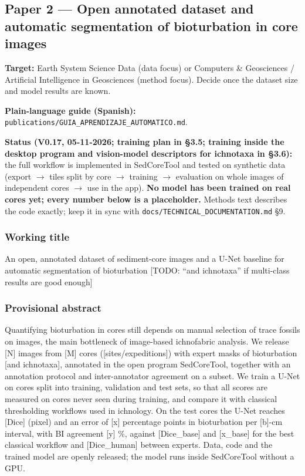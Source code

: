 \documentclass[
  10pt,
]{article}
\begin{document}
\hypertarget{paper-2-open-annotated-dataset-and-automatic-segmentation-of-bioturbation-in-core-images}{%
\subsection{Paper 2 --- Open annotated dataset and automatic
segmentation of bioturbation in core
images}\label{paper-2-open-annotated-dataset-and-automatic-segmentation-of-bioturbation-in-core-images}}

\textbf{Target:} Earth System Science Data (data focus) or Computers \&
Geosciences / Artificial Intelligence in Geosciences (method focus).
Decide once the dataset size and model results are known.

\textbf{Plain-language guide (Spanish):}
\texttt{publications/GUIA\_APRENDIZAJE\_AUTOMATICO.md}.

\textbf{Status (V0.17, 05-11-2026; training plan in §3.5; training
inside the desktop program and vision-model descriptors for ichnotaxa in
§3.6):} the full workflow is implemented in SedCoreTool and tested on
synthetic data (export $\rightarrow$ tiles split by core $\rightarrow$ training $\rightarrow$ evaluation on
whole images of independent cores $\rightarrow$ use in the app). \textbf{No model
has been trained on real cores yet; every number below is a
placeholder.} Methods text describes the code exactly; keep it in sync
with \texttt{docs/TECHNICAL\_DOCUMENTATION.md} §9.

\hypertarget{working-title}{%
\subsubsection{Working title}\label{working-title}}

An open, annotated dataset of sediment-core images and a U-Net baseline
for automatic segmentation of bioturbation {[}TODO: ``and ichnotaxa'' if
multi-class results are good enough{]}

\hypertarget{provisional-abstract}{%
\subsubsection{Provisional abstract}\label{provisional-abstract}}

Quantifying bioturbation in cores still depends on manual selection of
trace fossils on images, the main bottleneck of image-based ichnofabric
analysis. We release {[}N{]} images from {[}M{]} cores
({[}sites/expeditions{]}) with expert masks of bioturbation {[}and
ichnotaxa{]}, annotated in the open program SedCoreTool, together with
an annotation protocol and inter-annotator agreement on a subset. We
train a U-Net on cores split into training, validation and test sets, so
that all scores are measured on cores never seen during training, and
compare it with classical thresholding workflows used in ichnology. On
the test cores the U-Net reaches {[}Dice{]} (pixel) and an error of
{[}x{]} percentage points in bioturbation per {[}b{]}-cm interval, with
BI agreement {[}y{]} \%, against {[}Dice\_base{]} and {[}x\_base{]} for
the best classical workflow and {[}Dice\_human{]} between experts. Data,
code and the trained model are openly released; the model runs inside
SedCoreTool without a GPU.
\end{document}
